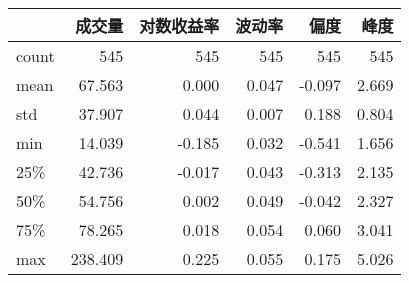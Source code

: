 \begin{tabular}{lrrrrr}
\toprule
{} &     成交量 &   对数收益率 &     波动率 &      偏度 &      峰度 \\
\midrule
count & 545 & 545 & 545 & 545 & 545 \\
mean  &  67.563 &  0.000 &   0.047 &  -0.097 &   2.669 \\
std   &  37.907 &   0.044 &   0.007 &   0.188 &   0.804 \\
min   &  14.039 &  -0.185 &   0.032 &  -0.541 &   1.656 \\
25\%   &  42.736 &  -0.017 &   0.043 &  -0.313 &   2.135 \\
50\%   &  54.756 &   0.002 &   0.049 &  -0.042 &   2.327 \\
75\%   &  78.265 &   0.018 &   0.054 &   0.060 &   3.041 \\
max   & 238.409 &   0.225 &   0.055 &   0.175 &   5.026 \\
\bottomrule
\end{tabular}
